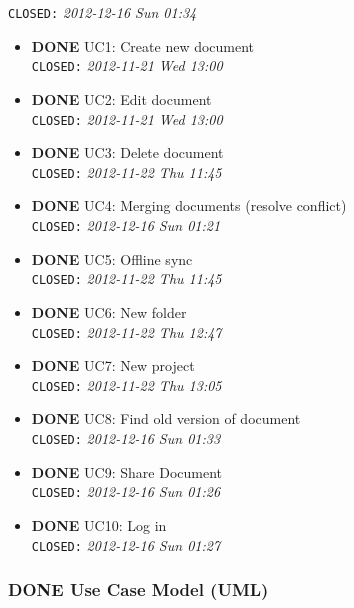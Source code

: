 \documentclass[11pt]{article}
\begin{document}
    \texttt{CLOSED:} \textit{2012-12-16 Sun 01:34}
\begin{itemize}

\item \textbf{DONE} UC1: Create new document\\
\label{sec-1-2-1-1}%
\texttt{CLOSED:} \textit{2012-11-21 Wed 13:00}


\item \textbf{DONE} UC2: Edit document\\
\label{sec-1-2-1-2}%
\texttt{CLOSED:} \textit{2012-11-21 Wed 13:00}


\item \textbf{DONE} UC3: Delete document\\
\label{sec-1-2-1-3}%
\texttt{CLOSED:} \textit{2012-11-22 Thu 11:45}


\item \textbf{DONE} UC4: Merging documents (resolve conflict)\\
\label{sec-1-2-1-4}%
\texttt{CLOSED:} \textit{2012-12-16 Sun 01:21}


\item \textbf{DONE} UC5: Offline sync\\
\label{sec-1-2-1-5}%
\texttt{CLOSED:} \textit{2012-11-22 Thu 11:45}


\item \textbf{DONE} UC6: New folder\\
\label{sec-1-2-1-6}%
\texttt{CLOSED:} \textit{2012-11-22 Thu 12:47}


\item \textbf{DONE} UC7: New project\\
\label{sec-1-2-1-7}%
\texttt{CLOSED:} \textit{2012-11-22 Thu 13:05}


\item \textbf{DONE} UC8: Find old version of document\\
\label{sec-1-2-1-8}%
\texttt{CLOSED:} \textit{2012-12-16 Sun 01:33}


\item \textbf{DONE} UC9: Share Document\\
\label{sec-1-2-1-9}%
\texttt{CLOSED:} \textit{2012-12-16 Sun 01:26}


\item \textbf{DONE} UC10: Log in\\
\label{sec-1-2-1-10}%
\texttt{CLOSED:} \textit{2012-12-16 Sun 01:27}

\end{itemize} %
\subsubsection{\textbf{DONE} Use Case Model (UML)}
\label{sec-1-2-2}
\end{document}
